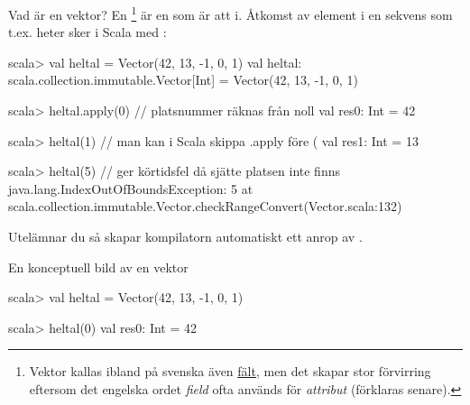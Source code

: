 \begin{Slide}{Vad är en vektor?}\SlideFontSmall
En \footnote{Vektor kallas ibland på svenska även \href{https://sv.wikipedia.org/wiki/F\%C3\%A4lt_\%28datastruktur\%29}{fält}, men det skapar stor förvirring eftersom det engelska ordet \emph{field} ofta används för \emph{attribut} (förklaras senare).}
 är en  som är  att  i.
Åtkomst av element i en sekvens som t.ex. heter  sker i Scala med :

\begin{REPL}
scala> val heltal = Vector(42, 13, -1, 0, 1)
val heltal: scala.collection.immutable.Vector[Int] = Vector(42, 13, -1, 0, 1)

scala> heltal.apply(0)   // platsnummer räknas från noll
val res0: Int = 42

scala> heltal(1)         // man kan i Scala skippa .apply före (
val res1: Int = 13

scala> heltal(5)         // ger körtidsfel då sjätte platsen inte finns
java.lang.IndexOutOfBoundsException: 5
  at scala.collection.immutable.Vector.checkRangeConvert(Vector.scala:132)
\end{REPL}
Utelämnar du  så skapar kompilatorn automatiskt ett anrop av .
\end{Slide}

\begin{Slide}{En konceptuell bild av en vektor}

\begin{REPLnonum}
scala> val heltal = Vector(42, 13, -1, 0, 1)

scala> heltal(0)
val res0: Int = 42
\end{REPLnonum}


\end{Slide}



